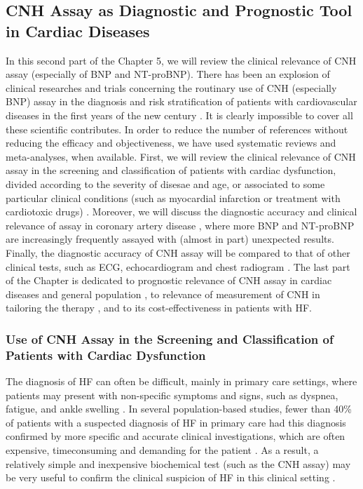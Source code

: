 \documentclass[14pt,a4paper,onecolumn]{extarticle}
\begin{document}
\subsection{ CNH Assay as Diagnostic and Prognostic Tool in Cardiac Diseases}
In this second part of the Chapter 5, we will review the clinical relevance of CNH assay
(especially of BNP and NT-proBNP). There has been an explosion of clinical researches and trials concerning the routinary use of CNH (especially BNP) assay in the diagnosis and risk stratification of patients with cardiovascular diseases in the first years of
the new century . It is clearly impossible to cover all these scientific contributes. In order to reduce the number of references
without reducing the efficacy and objectiveness, we have used systematic reviews and
meta-analyses, when available.
First, we will review the clinical relevance of CNH assay in the screening and classification of patients with cardiac dysfunction, divided according to the severity of disesae and age, or associated to some particular clinical conditions (such as myocardial
infarction or treatment with cardiotoxic drugs) . Moreover, we will discuss the diagnostic accuracy and clinical relevance of assay in coronary artery disease , where more  BNP and NT-proBNP are increasingly frequently assayed with (almost in part) unexpected results. Finally, the diagnostic accuracy of CNH assay will be compared to that of other clinical tests, such as ECG,
echocardiogram and chest radiogram .
The last part of the Chapter is dedicated to prognostic relevance of CNH assay in
cardiac diseases and general population , to relevance of
measurement of CNH in tailoring the therapy , and to its cost-effectiveness  in patients with HF.

\subsubsection{ Use of CNH Assay in the Screening and Classification of Patients with Cardiac Dysfunction}

The diagnosis of HF can often be difficult, mainly in primary care settings, where patients may present with non-specific symptoms and signs, such as dyspnea, fatigue, and ankle swelling \citep{bib368} \citep{bib369} \citep{bib370}. In several population-based studies, fewer than 40\% of patients with a suspected diagnosis of HF in primary care had this diagnosis confirmed by more specific and accurate clinical investigations, which are often expensive, timeconsuming and demanding for the patient \citep{bib368} \citep{bib369} \citep{bib370} \citep{bib3104} \citep{bib3105}. As a result, a relatively simple and inexpensive biochemical test (such as the CNH assay) may be very useful to confirm the clinical suspicion of HF in this clinical setting \citep{bib35} \citep{bib3131} \citep{bib335}.
\end{document}
